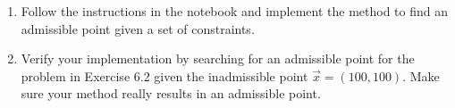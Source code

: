 \begin{exercise}[subtitle={Notebook}]
\begin{enumerate}[label=\emph{\alph*)}]
\item Follow the instructions in the notebook and implement the method to find an admissible point given a set of constraints.
\item Verify your implementation by searching for an admissible point for the problem in Exercise 6.2 given the inadmissible point $\vec{x} = (100,100)$. Make sure your method really results in an admissible point.
\end{enumerate}
\end{exercise}

